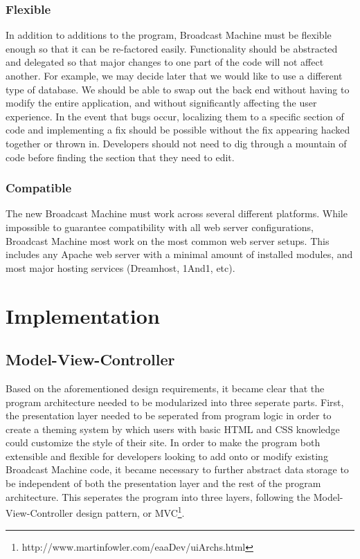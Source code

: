 \documentclass[a4paper,12pt]{report}
\begin{document}
\subsection{Flexible}
In addition to additions to the program, Broadcast Machine must be flexible enough so that it can be re-factored easily. 
Functionality should be abstracted and delegated so that major changes to one part of the code will not affect another. 
For example, we may decide later that we would like to use a different type of database. 
We should be able to swap out the back end without having to modify the entire application, and without significantly affecting the user experience. 
In the event that bugs occur, localizing them to a specific section of code and implementing a fix should be possible without the fix appearing hacked together or thrown in. 
Developers should not need to dig through a mountain of code before finding the section that they need to edit. 


\subsection{Compatible}
The new Broadcast Machine must work across several different platforms. 
While impossible to guarantee compatibility with all web server configurations, Broadcast Machine most work on the most common web server setups. 
This includes any Apache web server with a minimal amount of installed modules, and most major hosting services (Dreamhost, 1And1, etc). 

\chapter{Implementation}

\section{Model-View-Controller}
Based on the aforementioned design requirements, it became clear that the program architecture needed to be modularized into three seperate parts. First, the presentation layer needed to be seperated from program logic in order to create a theming system by which users with basic HTML and CSS knowledge could customize the style of their site. In order to make the program both extensible and flexible for developers looking to add onto or modify existing Broadcast Machine code, it became necessary to further abstract data storage to be independent of both the presentation layer and the rest of the program architecture. This seperates the program into three layers, following the Model-View-Controller design pattern, or MVC\footnote{http://www.martinfowler.com/eaaDev/uiArchs.html}.
\end{document}
